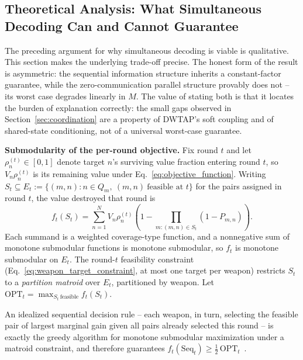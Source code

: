 \subsection{Theoretical Analysis: What Simultaneous Decoding Can and Cannot Guarantee}
\label{sec:submodular}

The preceding argument for why simultaneous decoding is viable is qualitative. This section makes the underlying trade-off precise. The honest form of the result is asymmetric: the sequential information structure inherits a constant-factor guarantee, while the zero-communication parallel structure provably does not -- its worst case degrades linearly in $M$. The value of stating both is that it locates the burden of explanation correctly: the small gaps observed in Section~\ref{sec:coordination} are a property of DWTAP's soft coupling and of shared-state conditioning, not of a universal worst-case guarantee.

\textbf{Submodularity of the per-round objective.} Fix round $t$ and let $\rho_n^{(t)}\in[0,1]$ denote target $n$'s surviving value fraction entering round $t$, so $V_n\rho_n^{(t)}$ is its remaining value under Eq.~\eqref{eq:objective_function}. Writing $S_t \subseteq E_t := \{(m,n): n\in Q_m,\ (m,n)\ \text{feasible at } t\}$ for the pairs assigned in round $t$, the value destroyed that round is
\begin{equation}
\label{eq:round-obj}
f_t(S_t) = \sum_{n=1}^N V_n\rho_n^{(t)}\left(1 - \!\!\prod_{m:(m,n)\in S_t}\!\!(1-P_{m,n})\right).
\end{equation}
Each summand is a weighted coverage-type function, and a nonnegative sum of monotone submodular functions is monotone submodular, so $f_t$ is monotone submodular on $E_t$. The round-$t$ feasibility constraint (Eq.~\eqref{eq:weapon_target_constraint}, at most one target per weapon) restricts $S_t$ to a \emph{partition matroid} over $E_t$, partitioned by weapon. Let $\text{OPT}_t = \max_{S_t\ \text{feasible}} f_t(S_t)$.

\begin{proposition}
\label{prop:seq-half}
An idealized sequential decision rule -- each weapon, in turn, selecting the feasible pair of largest marginal gain given all pairs already selected this round -- is exactly the greedy algorithm for monotone submodular maximization under a matroid constraint, and therefore guarantees $f_t(\mathrm{Seq}_t) \geq \tfrac12\,\text{OPT}_t$~\cite{fisher1978analysis}.
\end{proposition}

